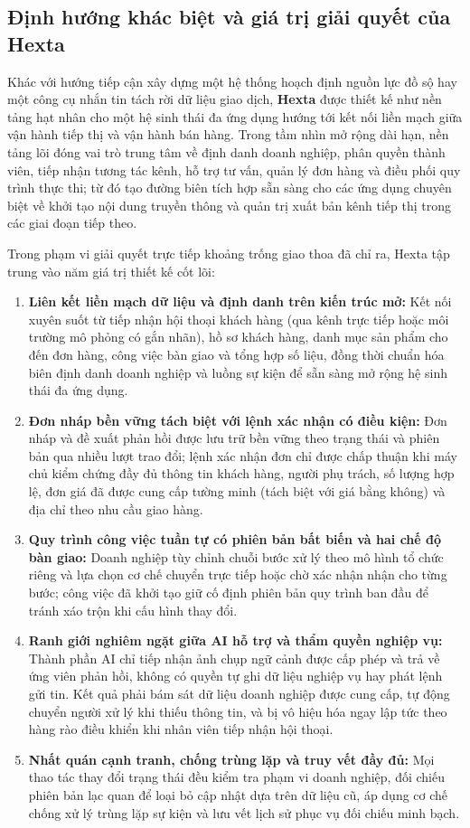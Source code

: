 \subsection{Định hướng khác biệt và giá trị giải quyết của Hexta}
Khác với hướng tiếp cận xây dựng một hệ thống hoạch định nguồn lực đồ sộ hay một công cụ nhắn tin tách rời dữ liệu giao dịch, \textbf{Hexta} được thiết kế như nền tảng hạt nhân cho một hệ sinh thái đa ứng dụng hướng tới kết nối liền mạch giữa vận hành tiếp thị và vận hành bán hàng. Trong tầm nhìn mở rộng dài hạn, nền tảng lõi đóng vai trò trung tâm về định danh doanh nghiệp, phân quyền thành viên, tiếp nhận tương tác kênh, hỗ trợ tư vấn, quản lý đơn hàng và điều phối quy trình thực thi; từ đó tạo đường biên tích hợp sẵn sàng cho các ứng dụng chuyên biệt về khởi tạo nội dung truyền thông và quản trị xuất bản kênh tiếp thị trong các giai đoạn tiếp theo.

Trong phạm vi giải quyết trực tiếp khoảng trống giao thoa đã chỉ ra, Hexta tập trung vào năm giá trị thiết kế cốt lõi:
\begin{enumerate}
  \item \textbf{Liên kết liền mạch dữ liệu và định danh trên kiến trúc mở:} Kết nối xuyên suốt từ tiếp nhận hội thoại khách hàng (qua kênh trực tiếp hoặc môi trường mô phỏng có gắn nhãn), hồ sơ khách hàng, danh mục sản phẩm cho đến đơn hàng, công việc bàn giao và tổng hợp số liệu, đồng thời chuẩn hóa biên định danh doanh nghiệp và luồng sự kiện để sẵn sàng mở rộng hệ sinh thái đa ứng dụng.
  \item \textbf{Đơn nháp bền vững tách biệt với lệnh xác nhận có điều kiện:} Đơn nháp và đề xuất phản hồi được lưu trữ bền vững theo trạng thái và phiên bản qua nhiều lượt trao đổi; lệnh xác nhận đơn chỉ được chấp thuận khi máy chủ kiểm chứng đầy đủ thông tin khách hàng, người phụ trách, số lượng hợp lệ, đơn giá đã được cung cấp tường minh (tách biệt với giá bằng không) và địa chỉ theo nhu cầu giao hàng.
  \item \textbf{Quy trình công việc tuần tự có phiên bản bất biến và hai chế độ bàn giao:} Doanh nghiệp tùy chỉnh chuỗi bước xử lý theo mô hình tổ chức riêng và lựa chọn cơ chế chuyển trực tiếp hoặc chờ xác nhận nhận cho từng bước; công việc đã khởi tạo giữ cố định phiên bản quy trình ban đầu để tránh xáo trộn khi cấu hình thay đổi.
  \item \textbf{Ranh giới nghiêm ngặt giữa AI hỗ trợ và thẩm quyền nghiệp vụ:} Thành phần AI chỉ tiếp nhận ảnh chụp ngữ cảnh được cấp phép và trả về ứng viên phản hồi, không có quyền tự ghi dữ liệu nghiệp vụ hay phát lệnh gửi tin. Kết quả phải bám sát dữ liệu doanh nghiệp được cung cấp, tự động chuyển người xử lý khi thiếu thông tin, và bị vô hiệu hóa ngay lập tức theo hàng rào điều khiển khi nhân viên tiếp nhận hội thoại.
  \item \textbf{Nhất quán cạnh tranh, chống trùng lặp và truy vết đầy đủ:} Mọi thao tác thay đổi trạng thái đều kiểm tra phạm vi doanh nghiệp, đối chiếu phiên bản lạc quan để loại bỏ cập nhật dựa trên dữ liệu cũ, áp dụng cơ chế chống xử lý trùng lặp sự kiện và lưu vết lịch sử phục vụ đối chiếu minh bạch.
\end{enumerate}

